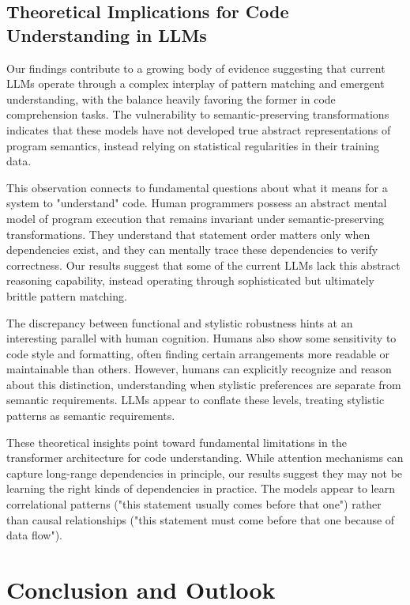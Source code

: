 \documentclass[%
thesis=student,%
coverpage=false,%
titlepage=false,%
headmarks=true, %
english,%
font=libertine, %
math=newpxtx, %
BCOR=5mm,%
coverBCOR=11mm%
]{tum-templates/book/tumbook}
\begin{document}
\section{Theoretical Implications for Code Understanding in LLMs}

Our findings contribute to a growing body of evidence suggesting that current LLMs operate through a complex interplay of pattern matching and emergent understanding, with the balance heavily favoring the former in code comprehension tasks. The vulnerability to semantic-preserving transformations indicates that these models have not developed true abstract representations of program semantics, instead relying on statistical regularities in their training data.

This observation connects to fundamental questions about what it means for a system to "understand" code. Human programmers possess an abstract mental model of program execution that remains invariant under semantic-preserving transformations. They understand that statement order matters only when dependencies exist, and they can mentally trace these dependencies to verify correctness. Our results suggest that some of the current LLMs lack this abstract reasoning capability, instead operating through sophisticated but ultimately brittle pattern matching.

The discrepancy between functional and stylistic robustness hints at an interesting parallel with human cognition. Humans also show some sensitivity to code style and formatting, often finding certain arrangements more readable or maintainable than others. However, humans can explicitly recognize and reason about this distinction, understanding when stylistic preferences are separate from semantic requirements. LLMs appear to conflate these levels, treating stylistic patterns as semantic requirements.

These theoretical insights point toward fundamental limitations in the transformer architecture for code understanding. While attention mechanisms can capture long-range dependencies in principle, our results suggest they may not be learning the right kinds of dependencies in practice. The models appear to learn correlational patterns ("this statement usually comes before that one") rather than causal relationships ("this statement must come before that one because of data flow").


\chapter{Conclusion and Outlook}
\end{document}
